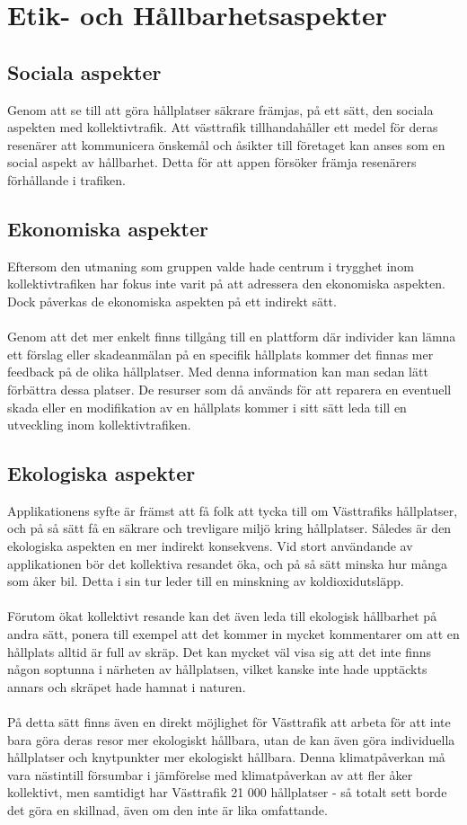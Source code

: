 \documentclass{article}
\begin{document}
\section*{Etik- och Hållbarhetsaspekter}
\subsection*{Sociala aspekter}
Genom att se till att göra hållplatser säkrare främjas, på ett sätt, den sociala aspekten med kollektivtrafik. Att västtrafik tillhandahåller ett medel för deras resenärer att kommunicera önskemål och åsikter till företaget kan anses som en social aspekt av hållbarhet. Detta för att appen försöker främja resenärers förhållande i trafiken.

\subsection*{Ekonomiska aspekter}
Eftersom den utmaning som gruppen valde hade centrum i trygghet inom kollektivtrafiken har fokus inte varit på att adressera den ekonomiska aspekten. Dock påverkas de ekonomiska aspekten på ett indirekt sätt. 
\\\\
Genom att det mer enkelt finns tillgång till en plattform där individer kan lämna ett förslag eller skadeanmälan på en specifik hållplats kommer det finnas mer feedback på de olika hållplatser. Med denna information kan man sedan lätt förbättra dessa platser. De resurser som då används för att reparera en eventuell skada eller en modifikation av en hållplats kommer i sitt sätt leda till en utveckling inom kollektivtrafiken.
\subsection*{Ekologiska aspekter}

Applikationens syfte är främst att få folk att tycka till om Västtrafiks hållplatser, och på så sätt få en säkrare och trevligare miljö kring hållplatser. Således är den ekologiska aspekten en mer indirekt konsekvens. Vid stort användande av applikationen bör det kollektiva resandet öka, och på så sätt minska hur många som åker bil. Detta i sin tur leder till en minskning av koldioxidutsläpp.
\\\\
Förutom ökat kollektivt resande kan det även leda till ekologisk hållbarhet på andra sätt, ponera till exempel att det kommer in mycket kommentarer om att en hållplats alltid är full av skräp. Det kan mycket väl visa sig att det inte finns någon soptunna i närheten av hållplatsen, vilket kanske inte hade upptäckts annars och skräpet hade hamnat i naturen. 
\\\\
På detta sätt finns även en direkt möjlighet för Västtrafik att arbeta för att inte bara göra deras resor mer ekologiskt hållbara, utan de kan även göra individuella hållplatser och knytpunkter mer ekologiskt hållbara. Denna klimatpåverkan må vara nästintill försumbar i jämförelse med klimatpåverkan av att fler åker kollektivt, men samtidigt har Västtrafik 21 000 hållplatser - så totalt sett borde det göra en skillnad, även om den inte är lika omfattande. 
\end{document}
